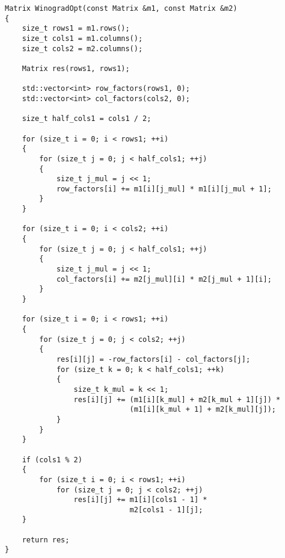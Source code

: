 \clearpage
\begin{lstlisting}[label={lst:winograd-opt}, caption={Реализация алгоритма Винограда с оптимизациями}]
Matrix WinogradOpt(const Matrix &m1, const Matrix &m2)
{
    size_t rows1 = m1.rows();
    size_t cols1 = m1.columns();
    size_t cols2 = m2.columns();

    Matrix res(rows1, rows1);

    std::vector<int> row_factors(rows1, 0);
    std::vector<int> col_factors(cols2, 0);

    size_t half_cols1 = cols1 / 2;

    for (size_t i = 0; i < rows1; ++i)
    {
        for (size_t j = 0; j < half_cols1; ++j)
        {
            size_t j_mul = j << 1;
            row_factors[i] += m1[i][j_mul] * m1[i][j_mul + 1];
        }
    }

    for (size_t i = 0; i < cols2; ++i)
    {
        for (size_t j = 0; j < half_cols1; ++j)
        {
            size_t j_mul = j << 1;
            col_factors[i] += m2[j_mul][i] * m2[j_mul + 1][i];
        }
    }

    for (size_t i = 0; i < rows1; ++i)
    {
        for (size_t j = 0; j < cols2; ++j)
        {
            res[i][j] = -row_factors[i] - col_factors[j];
            for (size_t k = 0; k < half_cols1; ++k)
            {
                size_t k_mul = k << 1;
                res[i][j] += (m1[i][k_mul] + m2[k_mul + 1][j]) *
                             (m1[i][k_mul + 1] + m2[k_mul][j]);
            }
        }
    }

    if (cols1 % 2)
    {
        for (size_t i = 0; i < rows1; ++i)
            for (size_t j = 0; j < cols2; ++j)
                res[i][j] += m1[i][cols1 - 1] * 
                             m2[cols1 - 1][j];
    }

    return res;
}
\end{lstlisting}

